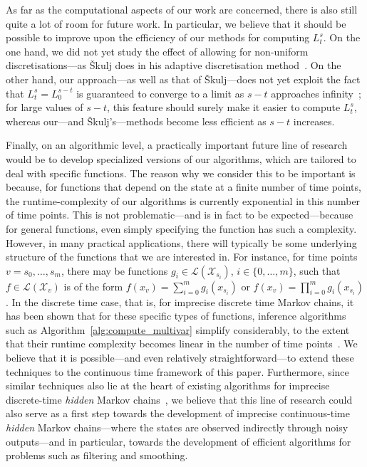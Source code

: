 \documentclass[10pt,a4paper]{paper}
\theoremstyle{definition}
\newcommand{\states}{\mathcal{X}}
\newcommand{\gambles}{\mathcal{L}}
\begin{document}
As far as the computational aspects of our work are concerned, there is also still quite a lot of room for future work. In particular, we believe that it should be possible to improve upon the efficiency of our methods for computing $L_t^s$. On the one hand, we did not yet study the effect of allowing for non-uniform discretisations---as \v{S}kulj does in his adaptive discretisation method~\cite{Skulj:2015cq}. On the other hand, our approach---as well as that of \v{S}kulj---does not yet exploit the fact that $L_t^s=L_0^{s-t}$ is guaranteed to converge to a limit as $s-t$ approaches infinity~\cite{DeBock:2016}; for large values of $s-t$, this feature should surely make it easier to compute $L_t^s$, whereas our---and \v{S}kulj's---methods become less efficient as $s-t$ increases. 


Finally, on an algorithmic level, a practically important future line of research would be to develop specialized versions of our algorithms, which are tailored to deal with specific functions. The reason why we consider this to be important is because, for functions that depend on the state at a finite number of time points, the runtime-complexity of our algorithms is currently exponential in this number of time points. This is not problematic---and is in fact to be expected---because for general functions, even simply specifying the function has such a complexity. However, in many practical applications, there will typically be some underlying structure of the functions that we are interested in. For instance, for time points $v=s_0,\ldots,s_m$, there may be functions $g_i\in\gambles(\states_{s_i})$, $i\in\{0,\ldots,m\}$, such that $f\in\gambles(\states_v)$ is of the form $f(x_v) = \sum_{i=0}^m g_i(x_{s_i})$ or $f(x_v) = \prod_{i=0}^m g_i(x_{s_i})$.
In the discrete time case, that is, for imprecise discrete time Markov chains, it has been shown that for these specific types of functions, inference algorithms such as Algorithm~\ref{alg:compute_multivar} simplify considerably, to the extent that their runtime complexity becomes linear in the number of time points~\cite{de2015credal,Lopatatzidis2015}. We believe that it is possible---and even relatively straightforward---to extend these techniques to the continuous time framework of this paper. Furthermore, since similar techniques also lie at the heart of existing algorithms for imprecise discrete-time \emph{hidden} Markov chains~\cite{Benavoli:2011ei,DeBock:2014ts}, we believe that this line of research could also serve as a first step towards the development of imprecise continuous-time \emph{hidden} Markov chains---where the states are observed indirectly through noisy outputs---and in particular, towards the development of efficient algorithms for problems such as filtering and smoothing.
\end{document}
